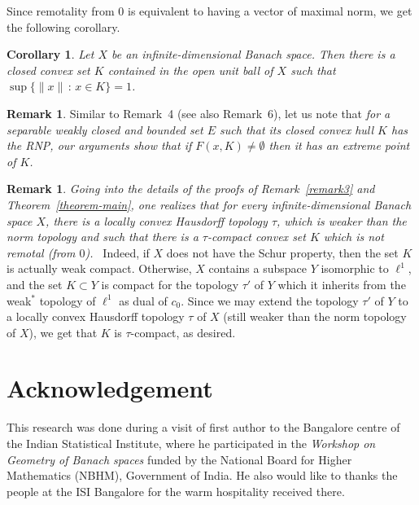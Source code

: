 \documentclass[11pt,a4paper]{amsart}
\theoremstyle{plain}
\newtheorem{corollary}[thm]{Corollary}
\theoremstyle{definition}
\newtheorem{rem}[thm]{Remark}
\begin{document}
Since remotality from $0$ is equivalent to having a vector of
maximal norm, we get the following corollary.

\begin{corollary}
Let $X$ be an infinite-dimensional Banach space. Then there is a
closed convex set $K$ contained in the \emph{open} unit ball of
$X$ such that $\sup\{\|x\|\,:\,x\in K\}=1$.

\end{corollary}

\begin{rem} Similar to Remark~4 (see also Remark~6), let us note that
{\slshape for a separable weakly closed and bounded set $E$ such
that its closed convex hull $K$ has the RNP, our arguments show
that if $F(x,K) \neq \emptyset$ then it has an extreme point of
$K$.}
\end{rem}

\begin{rem}
{\slshape Going into the details of the proofs of
Remark~\ref{remark3} and Theorem~\ref{theorem-main}, one realizes
that for every infinite-dimensional Banach space $X$, there is a
locally convex Hausdorff topology $\tau$, which is weaker than the
norm topology and  such that there is a $\tau$-compact convex set
$K$ which is not remotal (from $0$).\ } Indeed, if $X$ does not have
the Schur property, then the set $K$ is actually weak compact.
Otherwise, $X$ contains a subspace $Y$ isomorphic to $\ell^1$, and
the set $K\subset Y$ is compact for the topology $\tau'$ of $Y$
which it inherits from the weak$^\ast$ topology of $\ell^1$ as dual
of $c_0$. Since we may extend the topology $\tau'$ of $Y$ to a
locally convex Hausdorff topology $\tau$ of $X$ (still weaker than
the norm topology of $X$), we get that $K$ is $\tau$-compact, as
desired.
\end{rem}

\section*{Acknowledgement} This research was done during
a visit of first author to the Bangalore centre of the Indian
Statistical Institute, where he participated in the \emph{Workshop
on Geometry of Banach spaces} funded by the National Board for
Higher Mathematics (NBHM), Government of India. He also would like
to thanks the people at the ISI Bangalore for the warm hospitality
received there.
\end{document}
